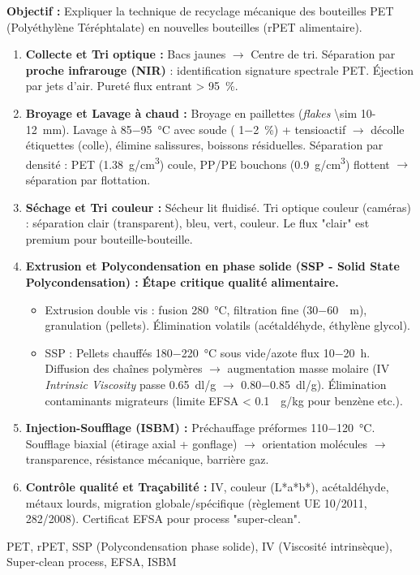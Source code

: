 \documentclass[11pt]{article}
\newcommand{\cle}[1]{{\popxbold\color{popdark}#1}}
\begin{document}
\begin{methode}
\textbf{Objectif :} Expliquer la technique de recyclage mécanique des bouteilles PET (Polyéthylène Téréphtalate) en nouvelles bouteilles (rPET alimentaire).
\begin{enumerate}
    \item \textbf{Collecte et Tri optique :} Bacs jaunes $\rightarrow$ Centre de tri. Séparation par \textbf{proche infrarouge (NIR)} : identification signature spectrale PET. Éjection par jets d'air. Pureté flux entrant > \SI{95}{\%}.
    \item \textbf{Broyage et Lavage à chaud :} Broyage en paillettes (\textit{flakes} \SI{\sim 10-12}{mm}). Lavage à \SI{85-95}{\celsius} avec soude ( \SI{1-2}{\%}) + tensioactif $\rightarrow$ décolle étiquettes (colle), élimine salissures, boissons résiduelles. Séparation par densité : PET (\SI{1,38}{g/cm^3}) coule, PP/PE bouchons (\SI{0,9}{g/cm^3}) flottent $\rightarrow$ séparation par flottation.
    \item \textbf{Séchage et Tri couleur :} Sécheur lit fluidisé. Tri optique couleur (caméras) : séparation clair (transparent), bleu, vert, couleur. Le flux "clair" est premium pour bouteille-bouteille.
    \item \textbf{Extrusion et Polycondensation en phase solide (SSP - Solid State Polycondensation) :} \textbf{Étape critique qualité alimentaire.}
    \begin{itemize}
        \item Extrusion double vis : fusion \SI{280}{\celsius}, filtration fine (\SI{30-60}{\mu m}), granulation (pellets). Élimination volatils (acétaldéhyde, éthylène glycol).
        \item SSP : Pellets chauffés \SI{180-220}{\celsius} sous vide/azote flux \SI{10-20}{h}. Diffusion des chaînes polymères $\rightarrow$ augmentation masse molaire (IV \textit{Intrinsic Viscosity} passe \SI{0,65}{dl/g} $\rightarrow$ \SI{0,80-0,85}{dl/g}). Élimination contaminants migrateurs (limite EFSA < \SI{0,1}{\mu g/kg} pour benzène etc.).
    \end{itemize}
    \item \textbf{Injection-Soufflage (ISBM) :} Préchauffage préformes \SI{110-120}{\celsius}. Soufflage biaxial (étirage axial + gonflage) $\rightarrow$ orientation molécules $\rightarrow$ transparence, résistance mécanique, barrière gaz.
    \item \textbf{Contrôle qualité et Traçabilité :} IV, couleur (L*a*b*), acétaldéhyde, métaux lourds, migration globale/spécifique (règlement UE 10/2011, 282/2008). Certificat EFSA pour process "super-clean".
\end{enumerate}
\cle{PET}, \cle{rPET}, \cle{SSP (Polycondensation phase solide)}, \cle{IV (Viscosité intrinsèque)}, \cle{Super-clean process}, \cle{EFSA}, \cle{ISBM}
\end{methode}
\end{document}
